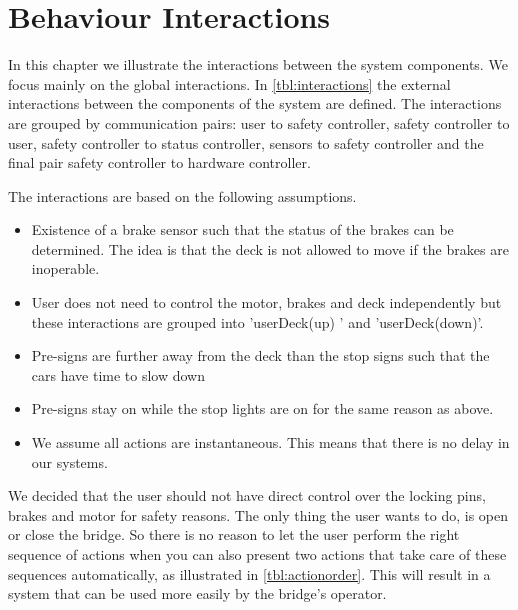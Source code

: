 \chapter{Behaviour Interactions}	\label{chap:interactions}
    In this chapter we illustrate the interactions between the system components. We focus mainly on the global interactions.    
    In \cref{tbl:interactions} the external interactions between the components of the system are defined. 
	The interactions are grouped by communication pairs: user to safety controller, safety controller to user, safety controller to status controller, sensors to safety controller and the final pair safety controller to hardware controller.
	
	The interactions are based on the following assumptions.
	
	\begin{itemize}
	  \item Existence of a brake sensor such that the status of the brakes can be
	  determined. The idea is that the deck is not allowed to move if the brakes are
	  inoperable.
	  \item User does not need to control the motor, brakes and deck independently but
	  these interactions are grouped into 'userDeck(up) ' and 'userDeck(down)'.
	  \item Pre-signs are further away from the deck than the stop signs such that
	  the cars have time to slow down
	  \item Pre-signs stay on while the stop lights are on for the same reason as
	  above.
	  \item We assume all actions are instantaneous. This means that there is no
	  delay in our systems.
	\end{itemize}
	
	We decided that the user should not have direct control over the locking pins, brakes and motor for safety reasons. The only thing the user wants to do, is open or close the bridge. So there is no reason to let the user perform the right sequence of actions when you can also present two actions that take care of these sequences automatically, as illustrated in \cref{tbl:actionorder}. This will result in a system that can be used more easily by the bridge's operator.



